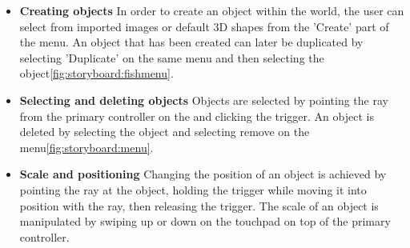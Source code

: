 \begin{itemize}
\item \textbf{Creating objects}
In order to create an object within the world, the user can select from imported images or default 3D shapes from the 'Create' part of the menu. An object that has been created can later be duplicated by selecting 'Duplicate' on the same menu and then selecting the object\ref{fig:storyboard:fishmenu}.
\item \textbf{Selecting and deleting objects}
Objects are selected by pointing the ray from the primary controller on the and clicking the trigger. An object is deleted by selecting the object and selecting remove on the menu\ref{fig:storyboard:menu}.
\item \textbf{Scale and positioning}
Changing the position of an object is achieved by pointing the ray at the object, holding the trigger while moving it into position with the ray, then releasing the trigger. The scale of an object is manipulated by  swiping up or down on the touchpad on top of the primary controller.
\end{itemize}
